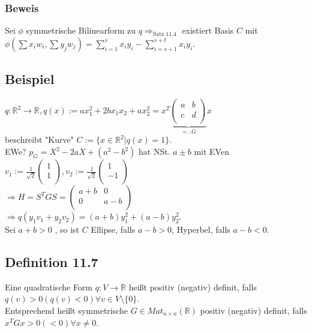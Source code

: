 \documentclass[a4paper, 12pt]{extarticle}
\begin{document}
\subsubsection*{Beweis}
Sei $ \phi$ symmetrische Bilinearform zu $q \Rightarrow_{\text{Satz 11.4}}$ existiert Basis $C$ mit $\phi(\sum x_iw_i, \sum y_jw_j) = \sum_{i=1}^{s}x_iy_i - \sum_{i=s+1}^{s+t}x_iy_i$.
\subsection*{Beispiel}
$q : \mathbb{R}^2 \longrightarrow \mathbb{R}, q(x) := ax_1^2 + 2bx_1x_2 + ax_2^2 = x^T \underbrace{\left(\begin{matrix}
		a & b \\
		c & d \\
	\end{matrix}\right)}_{=: G}x$ \\
beschreibt "Kurve" $C := \{ x \in \mathbb{R}^2 | q(x) = 1\}.$\\
EWe? $p_G = X^2 - 2aX + (a^2-b^2)$ hat NSt. $a \pm b$ mit EVen $v_1 := \frac{1}{\sqrt{2}} \left(\begin{matrix} 1 \\ 1 \\ \end{matrix}\right), v_2 := \frac{1}{\sqrt{2}}\left(\begin{matrix}1 \\ -1 \\ \end{matrix}\right)$\\
$\Rightarrow H = S^TGS = \left(\begin{matrix}
	a + b & 0 \\
	0 & a-b \\
\end{matrix}\right)$\\
$\Rightarrow q(y_1v_1 + y_2v_2) = (a+b)y_1^2 + (a-b) y_2^2$.\\
Sei $a+b > 0$ , so ist $C$ Ellipse, falls $a-b > 0$, Hyperbel, falls $a-b < 0$.
\subsection*{Definition 11.7}
Eine quadratische Form $q: V\longrightarrow \mathbb{R}$ heißt positiv (negativ) definit, falls \\
$q(v) > 0 (q(v) < 0) \forall v\in V \setminus \{0\}$.\\
Entsprechend heißt symmetrische $G \in Mat_{n \times n}(\mathbb{R})$ positiv (negativ) definit, falls \\
$x^TGx > 0 (<0) \forall x \neq 0$.
\end{document}
